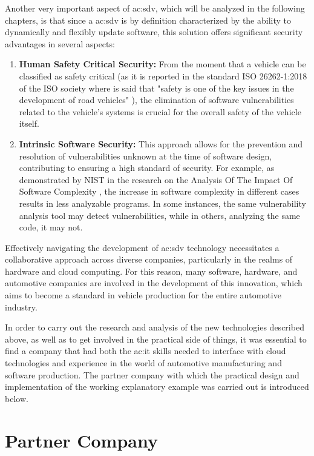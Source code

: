 Another very important aspect of \gls{ac:sdv}, which will be analyzed in the following chapters, is that since a \gls{ac:sdv} is by definition characterized by the ability to dynamically and flexibly update software, this solution offers significant security advantages in several aspects:
\begin{enumerate}
  \item \textbf{Human Safety Critical Security:} From the moment that a vehicle can be classified as safety critical (as it is reported in the standard ISO 26262-1:2018 of the ISO society where is said that "safety is one of the key issues in the development of road vehicles" \cite{ISO26262}), the elimination of software vulnerabilities related to the vehicle's systems is crucial for the overall safety of the vehicle itself.  
  \item \textbf{Intrinsic Software Security:} This approach allows for the prevention and resolution of vulnerabilities unknown at the time of software design, contributing to ensuring a high standard of security. For example, as demonstrated by NIST in the research on the Analysis Of The Impact Of Software Complexity \cite{NISTCodeComplexity}, the increase in software complexity in different cases results in less analyzable programs. In some instances, the same vulnerability analysis tool may detect vulnerabilities, while in others, analyzing the same code, it may not. 
\end{enumerate}

Effectively navigating the development of \gls{ac:sdv} technology necessitates a collaborative approach across diverse companies, particularly in the realms of hardware and cloud computing. For this reason, many software, hardware, and automotive companies are involved in the development of this innovation, which aims to become a standard in vehicle production for the entire automotive industry.

In order to carry out the research and analysis of the new technologies described above, as well as to get involved in the practical side of things, it was essential to find a company that had both the \gls{ac:it} skills needed to interface with cloud technologies and experience in the world of automotive manufacturing and software production. The partner company with which the practical design and implementation of the working explanatory example was carried out is introduced below.
\section{Partner Company}

